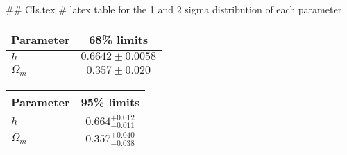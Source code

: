 ## CIs.tex
# latex table for the 1 and 2 sigma distribution of each parameter

\begin{tabular} { l  c}
 Parameter &  68\% limits\\
\hline
{\boldmath$h              $} & $0.6642\pm 0.0058          $\\
{\boldmath$\Omega_m       $} & $0.357\pm 0.020            $\\
\hline
\end{tabular}

\begin{tabular} { l  c}
 Parameter &  95\% limits\\
\hline
{\boldmath$h              $} & $0.664^{+0.012}_{-0.011}   $\\
{\boldmath$\Omega_m       $} & $0.357^{+0.040}_{-0.038}   $\\
\hline
\end{tabular}
